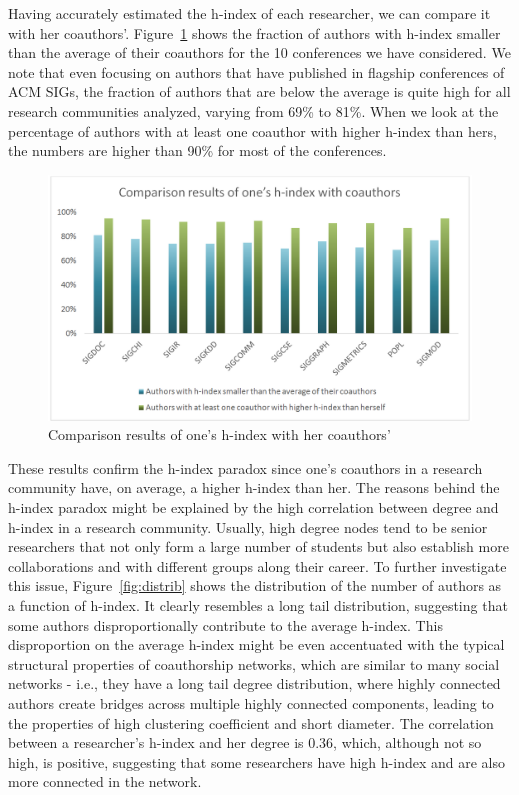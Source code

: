 \documentclass[letterpaper]{article}
\begin{document}
Having accurately estimated the h-index of each researcher, we can compare it with her coauthors'. Figure~\ref{fig:comp} shows the fraction of authors with h-index smaller than the average of their coauthors for the 10 conferences we have considered. We note that even focusing on authors that have published in flagship conferences of ACM SIGs, the fraction of authors that are below the average is quite high for all research communities analyzed, varying from 69\% to 81\%. When we look at the percentage of authors with at least one coauthor with higher h-index than hers, the numbers are higher than 90\% for most of the conferences.


\begin{figure}[t]
  \centering
  \includegraphics[width=.77\textwidth]{figures/fig1.png}
  \caption{Comparison results of one's h-index with her coauthors'}
  \label{fig:comp}
\end{figure}


These results confirm the h-index paradox since one's coauthors in a research community have, on average, a higher h-index than her. The reasons behind the h-index paradox might be explained by the high correlation between degree and h-index in a research community. Usually, high degree nodes tend to be senior researchers that not only form a large number of students but also establish more collaborations and with different groups along their career. To further investigate this issue, Figure~\ref{fig:distrib} shows the distribution of the number of authors as a function of h-index. It clearly resembles a long tail distribution, suggesting that some authors disproportionally contribute to the average h-index. This disproportion on the average h-index might be even accentuated with the typical structural properties of coauthorship networks, which are similar to many social networks \cite{seis} \cite{oito} - i.e., they have a long tail degree distribution, where highly connected authors create bridges across multiple highly connected components, leading to the properties of high clustering coefficient and short diameter. The correlation between a researcher's h-index and her degree is 0.36, which, although not so high, is positive, suggesting that some researchers have high h-index and are also more connected in the network.
\end{document}
